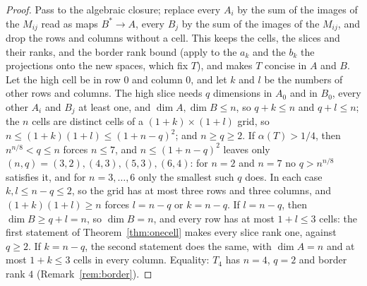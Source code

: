 \documentclass[11pt]{article}
\theoremstyle{definition}
\theoremstyle{remark}
\begin{document}
\begin{proof}
Pass to the algebraic closure; replace every $A_i$ by the sum of the images of the $M_{ij}$ read as maps $B^*\to A$, every $B_j$ by the sum of the images of the $M_{ij}$, and drop the rows and columns without a cell. This keeps the cells, the slices and their ranks, and the border rank bound (apply to the $a_k$ and the $b_k$ the projections onto the new spaces, which fix $T$), and makes $T$ concise in $A$ and $B$. Let the high cell be in row $0$ and column $0$, and let $k$ and $l$ be the numbers of other rows and columns. The high slice needs $q$ dimensions in $A_0$ and in $B_0$, every other $A_i$ and $B_j$ at least one, and $\dim A,\dim B\le n$, so $q+k\le n$ and $q+l\le n$; the $n$ cells are distinct cells of a $(1+k)\times(1+l)$ grid, so $n\le(1+k)(1+l)\le(1+n-q)^2$; and $n\ge q\ge2$. If $\alpha(T)>1/4$, then $n^{n/8}<q\le n$ forces $n\le7$, and $n\le(1+n-q)^2$ leaves only $(n,q)=(3,2),(4,3),(5,3),(6,4)$: for $n=2$ and $n=7$ no $q>n^{n/8}$ satisfies it, and for $n=3,\dots,6$ only the smallest such $q$ does. In each case $k,l\le n-q\le2$, so the grid has at most three rows and three columns, and $(1+k)(1+l)\ge n$ forces $l=n-q$ or $k=n-q$. If $l=n-q$, then $\dim B\ge q+l=n$, so $\dim B=n$, and every row has at most $1+l\le3$ cells: the first statement of Theorem~\ref{thm:onecell} makes every slice rank one, against $q\ge2$. If $k=n-q$, the second statement does the same, with $\dim A=n$ and at most $1+k\le3$ cells in every column. Equality: $T_4$ has $n=4$, $q=2$ and border rank $4$ (Remark~\ref{rem:border}).
\end{proof}
\end{document}
